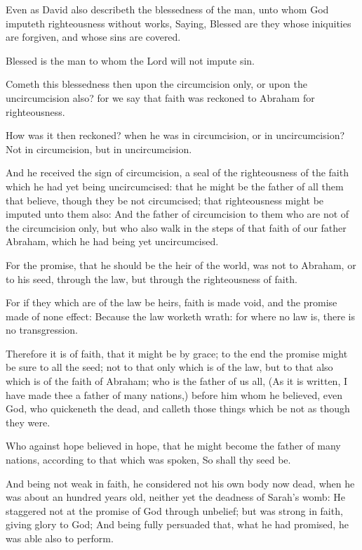 \verse Even as David also describeth the blessedness of the man, unto whom God imputeth righteousness without works, \verse Saying, Blessed are they whose iniquities are forgiven, and whose sins are covered.

\verse Blessed is the man to whom the Lord will not impute sin.

\verse Cometh this blessedness then upon the circumcision only, or upon the uncircumcision also? for we say that faith was reckoned to Abraham for righteousness.

\verse How was it then reckoned? when he was in circumcision, or in uncircumcision? Not in circumcision, but in uncircumcision.

\verse And he received the sign of circumcision, a seal of the righteousness of the faith which he had yet being uncircumcised: that he might be the father of all them that believe, though they be not circumcised; that righteousness might be imputed unto them also: \verse And the father of circumcision to them who are not of the circumcision only, but who also walk in the steps of that faith of our father Abraham, which he had being yet uncircumcised.

\verse For the promise, that he should be the heir of the world, was not to Abraham, or to his seed, through the law, but through the righteousness of faith.

\verse For if they which are of the law be heirs, faith is made void, and the promise made of none effect: \verse Because the law worketh wrath: for where no law is, there is no transgression.

\verse Therefore it is of faith, that it might be by grace; to the end the promise might be sure to all the seed; not to that only which is of the law, but to that also which is of the faith of Abraham; who is the father of us all, \verse (As it is written, I have made thee a father of many nations,) before him whom he believed, even God, who quickeneth the dead, and calleth those things which be not as though they were.

\verse Who against hope believed in hope, that he might become the father of many nations, according to that which was spoken, So shall thy seed be.

\verse And being not weak in faith, he considered not his own body now dead, when he was about an hundred years old, neither yet the deadness of Sarah's womb: \verse He staggered not at the promise of God through unbelief; but was strong in faith, giving glory to God; \verse And being fully persuaded that, what he had promised, he was able also to perform.


